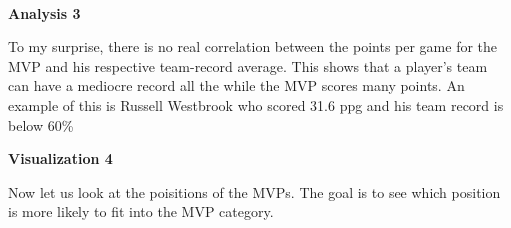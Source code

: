 \documentclass[11pt]{article}
\begin{document}
    \begin{center}
    \end{center}
    { \hspace*{\fill} \\}
    
    \textbf{Analysis 3} \newline

To my surprise, there is no real correlation between the points per game
for the MVP and his respective team-record average. This shows that a
player's team can have a mediocre record all the while the MVP scores
many points. An example of this is Russell Westbrook who scored 31.6 ppg
and his team record is below 60\% \newline
\newline

\textbf{Visualization 4} \newline

Now let us look at the poisitions of the MVPs. The goal is to see which
position is more likely to fit into the MVP category.
\end{document}
